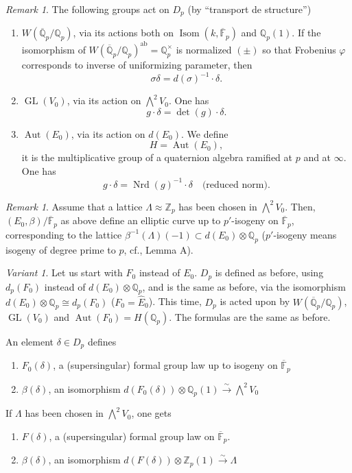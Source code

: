 \documentclass[11pt,a4paper]{article}
\theoremstyle{plain}
\theoremstyle{definition}
\theoremstyle{remark}
\newtheorem{remark}[theorem]{Remark}
\newtheorem*{variant}{Variant}
\DeclareMathOperator{\Aut}{Aut}
\DeclareMathOperator{\Isom}{Isom}
\DeclareMathOperator{\GL}{GL}
\DeclareMathOperator{\Nrd}{Nrd}
\newcommand{\Qpbar}{\overline{\mathbb{Q}}_{p}}
\newcommand{\Fpbar}{\overline{\mathbb{F}}_{p}}
\newcommand{\Zp}{\mathbb{Z}_{p}}
\newcommand{\Qp}{\mathbb{Q}_{p}}
\begin{document}
\begin{remark}
The following groups act on $D_{p}$ (by ``transport de structure'')
\begin{enumerate}[label=(\alph*)]
\item $W(\Qpbar/\Qp)$, via its actions both on $\Isom(k, \Fpbar)$ and $\Qp(1)$. If the isomorphism of $W(\Qpbar/\Qp)^{\mathrm{ab}} = \Qp^{\times}$ is normalized $(\pm)$ so that Frobenius $\varphi$ corresponds to inverse of uniformizing parameter, then
\[
\sigma\delta = d(\sigma)^{-1} \cdot \delta.
\]
\item $\GL(V_{0})$, via its action on $\bigwedge^{2} V_{0}$. One has
\[
g \cdot \delta = \det(g) \cdot \delta.
\]
\item $\Aut(E_{0})$, via its action on $d(E_{0})$. We define
\[
H = \Aut(E_{0}),
\]
it is the multiplicative group of a quaternion algebra ramified at $p$ and at $\infty$. One has
\[
g \cdot \delta = \Nrd(g)^{-1} \cdot \delta \quad \text{(reduced norm)}.
\]
\end{enumerate}
\end{remark}

\begin{remark}
Assume that a lattice $\Lambda \approx \Zp$ has been chosen in $\bigwedge^{2} V_{0}$. Then, $(E_{0}, \beta)/\Fpbar$ as above define an elliptic curve up to $p'$-isogeny on $\Fpbar$, corresponding to the lattice $\beta^{-1}(\Lambda)(-1) \subset d(E_{0}) \otimes \Qp$ ($p'$-isogeny means isogeny of degree prime to $p$, cf., Lemma A).
\end{remark}

\begin{variant}
Let us start with $F_{0}$ instead of $E_{0}$. $D_{p}$ is defined as before, using $d_{p}(F_{0})$ instead of $d(E_{0}) \otimes \Qp$, and is the same as before, via the isomorphism $d(E_{0}) \otimes \Qp \cong d_{p}(F_{0})$ ($F_{0} = \widehat{E}_{0}$). This time, $D_{p}$ is acted upon by $W(\Qpbar/\Qp)$, $\GL(V_{0})$ and $\Aut(F_{0}) = H(\Qp)$. The formulas are the same as before.

An element $\delta \in D_{p}$ defines
\begin{enumerate}[label=(\alph*)]
\item $F_{0}(\delta)$, a (supersingular) formal group law up to isogeny on $\Fpbar$
\item $\beta(\delta)$, an isomorphism $d(F_{0}(\delta)) \otimes \Qp(1) \xrightarrow{\sim} \bigwedge^{2} V_{0}$
\end{enumerate}
If $\Lambda$ has been chosen in $\bigwedge^{2} V_{0}$, one gets
\begin{enumerate}[label=(\alph*)]
\item $F(\delta)$, a (supersingular) formal group law on $\Fpbar$.
\item $\beta(\delta)$, an isomorphism $d(F(\delta)) \otimes \Zp(1) \xrightarrow{\sim} \Lambda$
\end{enumerate}
\end{variant}
\end{document}
